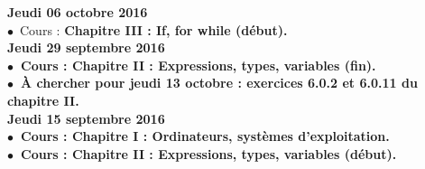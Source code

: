 \documentclass[12pt,a4paper]{article}
\begin{document}
\noindent\textbf{\bf Jeudi 06 octobre 2016 \rm}\\
$\bullet$\ Cours : \bf Chapitre III \rm : If, for while (début).\vspace{.4cm}\\
  
\noindent\textbf{\bf Jeudi 29 septembre 2016 \rm}\\
$\bullet$\ Cours :  \bf Chapitre II \rm : Expressions, types, variables (fin).\\
$\bullet$\ À chercher pour jeudi 13 octobre : exercices 6.0.2 et 6.0.11 du chapitre 
II.\vspace{.4cm}\\

\noindent\textbf{\bf Jeudi 15 septembre 2016 \rm}\\
$\bullet$\ Cours :  \bf Chapitre I \rm : Ordinateurs, systèmes d'exploitation.\vspace{.4cm}\\
$\bullet$\ Cours :  \bf Chapitre II \rm : Expressions, types, variables (début).\vspace{.4cm}\\


\label{end}
\end{document}
